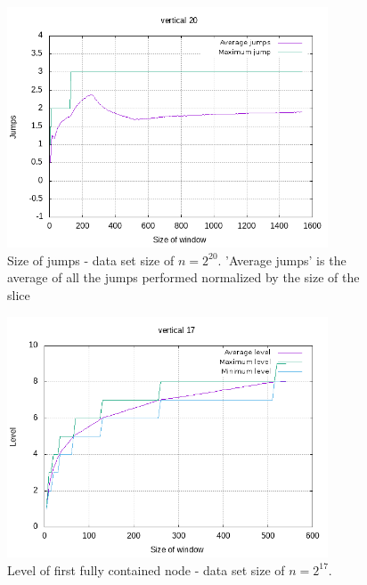 \begin{figure}[h]
    \centering
    \includegraphics[width = 0.85\textwidth]{pictures/analysis/jump_vert_20.png}
    \caption{Size of jumps - data set size of $n=2^{20}$. 'Average jumps' is the average of all the jumps performed normalized by the size of the slice}\label{fig:jump_vert_20}
\end{figure}



\begin{figure}[h]
    \centering
    \includegraphics[width = 0.85\textwidth]{pictures/analysis/level_vert_17.png}
    \caption{Level of first fully contained node - data set size of $n=2^{17}$.}\label{fig:level_vert_17}
\end{figure}

